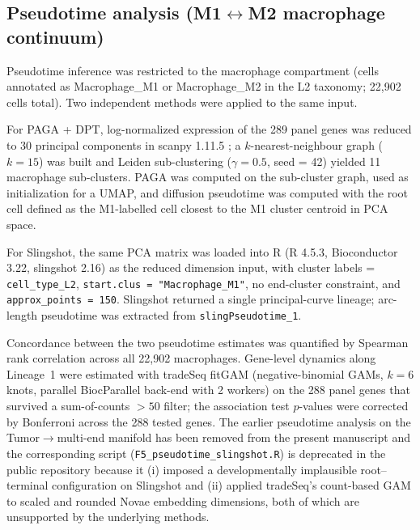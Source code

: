 \documentclass[12pt,a4paper]{article}
\begin{document}
\subsection*{Pseudotime analysis (M1$\leftrightarrow$M2 macrophage continuum)}
Pseudotime inference was restricted to the macrophage compartment (cells annotated as Macrophage\_M1 or Macrophage\_M2 in the L2 taxonomy; 22,902 cells total). Two independent methods were applied to the same input.

For PAGA + DPT, log-normalized expression of the 289 panel genes was reduced to 30 principal components in scanpy 1.11.5 \citep{wolf2018scanpy}; a $k$-nearest-neighbour graph ($k = 15$) was built and Leiden sub-clustering ($\gamma = 0.5$, seed = 42) yielded 11 macrophage sub-clusters. PAGA \citep{wolf2019paga} was computed on the sub-cluster graph, used as initialization for a UMAP, and diffusion pseudotime \citep{haghverdi2016dpt} was computed with the root cell defined as the M1-labelled cell closest to the M1 cluster centroid in PCA space.

For Slingshot, the same PCA matrix was loaded into R (R 4.5.3, Bioconductor 3.22, slingshot 2.16) as the reduced dimension input, with cluster labels = \texttt{cell\_type\_L2}, \texttt{start.clus = "Macrophage\_M1"}, no end-cluster constraint, and \texttt{approx\_points = 150}. Slingshot returned a single principal-curve lineage; arc-length pseudotime was extracted from \texttt{slingPseudotime\_1}.

Concordance between the two pseudotime estimates was quantified by Spearman rank correlation across all 22,902 macrophages. Gene-level dynamics along Lineage~1 were estimated with tradeSeq \citep{vandenberge2020tradeseq} fitGAM (negative-binomial GAMs, $k = 6$ knots, parallel BiocParallel back-end with 2 workers) on the 288 panel genes that survived a sum-of-counts $> 50$ filter; the association test $p$-values were corrected by Bonferroni across the 288 tested genes. The earlier pseudotime analysis on the Tumor$\to$multi-end manifold has been removed from the present manuscript and the corresponding script (\texttt{F5\_pseudotime\_slingshot.R}) is deprecated in the public repository because it (i) imposed a developmentally implausible root--terminal configuration on Slingshot and (ii) applied tradeSeq's count-based GAM to scaled and rounded Novae embedding dimensions, both of which are unsupported by the underlying methods.
\end{document}
